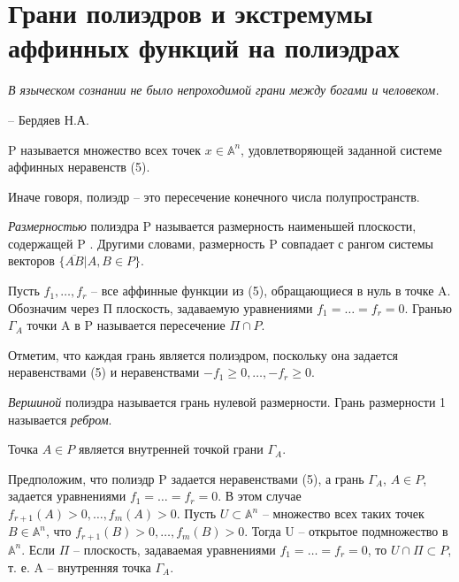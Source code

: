 \chapter{Грани полиэдров и экстремумы аффинных функций на полиэдрах}
\label{cha:10}

\epigraph{
	\textit{В языческом сознании не было непроходимой грани между богами и человеком.}}
{-- Бердяев Н.А.}

\begin{definition}\label{cha:10/def:1}
	 P называется множество всех точек $x \in \mathbb{A}^n$, удовлетворяющей заданной системе аффинных неравенств (5).
\end{definition}

Иначе говоря, полиэдр – это пересечение конечного числа полупространств. 

\textit{Размерностью} полиэдра P называется размерность наименьшей плоскости, содержащей P . Другими словами, размерность P совпадает с рангом системы векторов $\{ \overline{AB} | A, B \in P \}$. 

Пусть $f_1, \dots, f_r$ – все аффинные функции из (5), обращающиеся в нуль в точке A. Обозначим через П плоскость, задаваемую уравнениями $f_1 = \dots = f_r = 0$. Гранью $\Gamma_A$ точки A в P называется пересечение $\Pi \cap P$.

Отметим, что каждая грань является полиэдром, поскольку она задается неравенствами (5) и неравенствами $−f_1 \ge 0, \dots, −f_r \ge 0$.

\begin{definition}\label{cha:10/def:2}
	\textit{Вершиной} полиэдра называется грань нулевой размерности. Грань размерности 1 называется \textit{ребром}.
\end{definition}

\begin{propose}\label{cha:10/propose:1}
	Точка $A \in P$ является внутренней точкой грани $\Gamma_A$.
\end{propose}
\begin{Proof}
	Предположим, что полиэдр P задается неравенствами (5), а грань $\Gamma_A$, $A \in P$, задается уравнениями $f_1 = \dots = f_r = 0$. В этом случае $f_{r+1}(A) > 0, \dots, f_m(A) > 0$. Пусть $U \subset \mathbb{A}^n$ – множество всех таких точек $B \in \mathbb{A}^n$, что $f_{r+1}(B) > 0, \dots, f_m(B) > 0$. Тогда U – открытое подмножество в $\mathbb{A}^n$. Если $\Pi$ – плоскость, задаваемая уравнениями $f_1 = \dots = f_r = 0$, то $U \cap \Pi \subset P$, т. е. A – внутренняя точка $\Gamma_A$.
\end{Proof}

